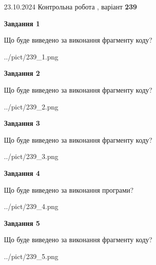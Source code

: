 \documentclass[12pt, ukrainian]{article}
\begin{document}
{\Large{23.10.2024 Контрольна робота , варіант  \No \textbf { 239 }\par}}
{
\begin {large}
{\begin {center}\textbf{Завдання 1}\end {center}}

Що буде виведено за виконання фрагменту коду?\par
\begin{center}
	{../pict/239_1.png}
\end{center}
\newpage

{\begin {center}\textbf{Завдання 2}\end {center}}

Що буде виведено за виконання фрагменту коду?\par
\begin{center}
	{../pict/239_2.png}
\end{center}
\newpage

{\begin {center}\textbf{Завдання 3}\end {center}}

Що буде виведено за виконання фрагменту коду?\par
\begin{center}
	{../pict/239_3.png}
\end{center}
\newpage

{\begin {center}\textbf{Завдання 4}\end {center}}

Що буде виведено за виконання програми?\par
\begin{center}
	{../pict/239_4.png}
\end{center}
\newpage

{\begin {center}\textbf{Завдання 5}\end {center}}

Що буде виведено за виконання фрагменту коду?\par
\begin{center}
	{../pict/239_5.png}
\end{center}
\newpage


\end{large}}
\end{document}
